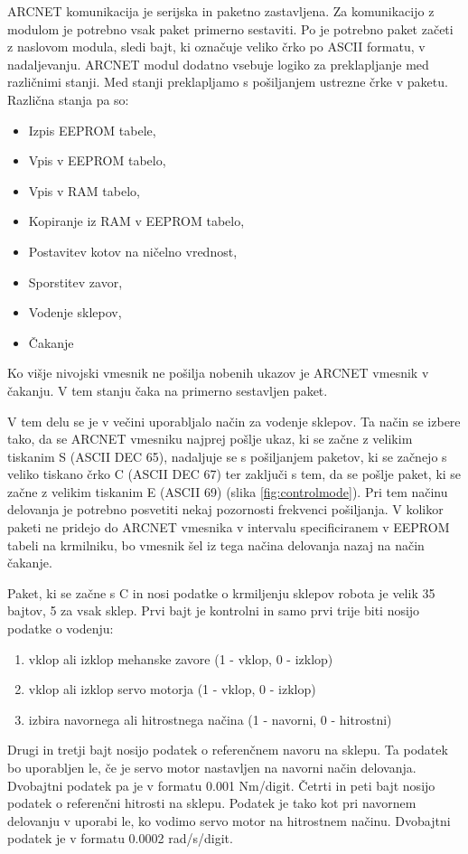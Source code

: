 \documentclass[a4paper]{article}
\begin{document}
ARCNET komunikacija je serijska in paketno zastavljena. Za komunikacijo z modulom je potrebno vsak paket primerno sestaviti. Po \cite{pa10-manual} je potrebno paket začeti z naslovom modula, sledi bajt, ki označuje veliko črko po ASCII formatu, v nadaljevanju. ARCNET modul dodatno vsebuje logiko za preklapljanje med različnimi stanji. Med stanji preklapljamo s pošiljanjem ustrezne črke v paketu. Različna stanja pa so:


\begin{itemize}
	\item Izpis EEPROM tabele,
	\item Vpis v EEPROM tabelo,
	\item Vpis v RAM tabelo,
	\item Kopiranje iz RAM v EEPROM tabelo,
	\item Postavitev kotov na ničelno vrednost,	
	\item Sporstitev zavor,
	\item Vodenje sklepov,
	\item Čakanje
\end{itemize}

Ko višje nivojski vmesnik ne pošilja nobenih ukazov je ARCNET vmesnik v čakanju. V tem stanju čaka na primerno sestavljen paket.

V tem delu se je v večini uporabljalo način za vodenje sklepov. Ta način se izbere tako, da se ARCNET vmesniku najprej pošlje ukaz, ki se začne z velikim tiskanim S (ASCII DEC 65), nadaljuje se s pošiljanjem paketov, ki se začnejo s veliko tiskano črko C (ASCII DEC 67) ter zaključi s tem, da se pošlje paket, ki se začne z velikim tiskanim E (ASCII 69) (slika \ref{fig:controlmode}). Pri tem načinu delovanja je potrebno posvetiti nekaj pozornosti frekvenci pošiljanja. V kolikor paketi ne pridejo do ARCNET vmesnika v intervalu specificiranem v EEPROM tabeli na krmilniku, bo vmesnik šel iz tega načina delovanja nazaj na način čakanje.

Paket, ki se začne s C in nosi podatke o krmiljenju sklepov robota je velik 35 bajtov, 5 za vsak sklep. Prvi bajt je kontrolni in samo prvi trije  biti nosijo podatke o vodenju:

\begin{enumerate}
	\item vklop ali izklop mehanske zavore (1 - vklop, 0 - izklop)
	\item vklop ali izklop servo motorja (1 - vklop, 0 - izklop)
	\item izbira navornega ali hitrostnega načina (1 - navorni, 0 - hitrostni)
\end{enumerate}
Drugi in tretji bajt nosijo podatek o referenčnem navoru na sklepu. Ta podatek bo uporabljen le, če je servo motor nastavljen na navorni način delovanja. Dvobajtni podatek pa je v formatu 0.001 Nm/digit.
Četrti in peti bajt nosijo podatek o referenčni hitrosti na sklepu. Podatek je tako kot pri navornem delovanju v uporabi le, ko vodimo servo motor na hitrostnem načinu. Dvobajtni podatek je v formatu 0.0002 rad/s/digit.
\end{document}
